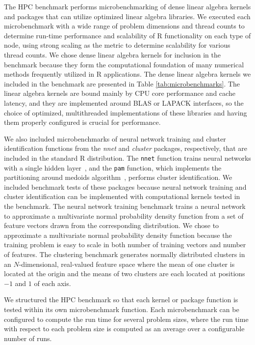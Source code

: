 The HPC benchmark performs mi\-cro\-bench\-mark\-ing of dense linear algebra kernels and
packages that can utilize optimized linear algebra libraries.
We executed each microbenchmark with a wide range of problem dimensions and
thread counts to determine run-time performance and scalability of R
functionality on each type of node, using strong scaling as the metric to determine
scalability for various thread counts. We chose dense linear algebra kernels for inclusion
in the benchmark because they form the computational foundation of many numerical methods
frequently utilized in R applications.  The dense linear algebra kernels we included in the
benchmark are presented in Table \ref{tab:microbenchmarks}.
The linear algebra kernels are bound mainly by CPU core performance and cache latency,
and they are implemented around BLAS or LAPACK interfaces, so the choice of
optimized, multithreaded implementations of these libraries and having them properly
configured is crucial for performance.

We also included microbenchmarks of neural network training and cluster identification
functions from the \textit{nnet} and \textit{cluster} packages, respectively, that are
included in the standard R distribution. The \texttt{nnet} function trains
neural networks with a single hidden layer~\cite{ripley:pattern96}, and the \texttt{pam}
function, which implements the partitioning around medoids algorithm~\cite{chu:kmedoids,
reynolds:clustering}, performs cluster identification. We included benchmark
tests of these packages because neural network training and cluster identification can be
implemented with computational kernels tested in the benchmark.
The neural network training benchmark trains a neural network to approximate a
multivariate normal probability density function from a set of feature vectors drawn
from the corresponding distribution.  We chose to approximate a multivariate normal probability
density function because the training problem is easy to scale in both number of training
vectors and number of features. The clustering benchmark generates normally distributed
clusters in an $N$-dimensional, real-valued feature space where the mean of one cluster is
located at the origin and the means of two clusters are each located at positions $-1$ and
$1$ of each axis.

We structured the HPC benchmark so that each kernel or package function is tested within
its own microbenchmark function. Each microbenchmark can be configured to
compute the run time for several problem sizes, where the run time with
respect to each problem size is computed as an average over a configurable number of runs.

